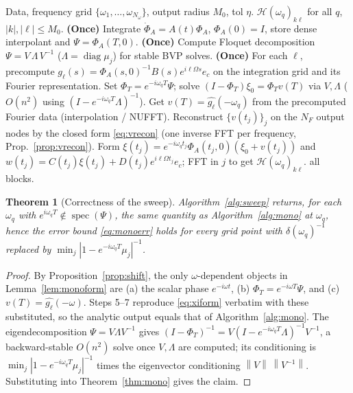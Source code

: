 \documentclass{amsart}
\newtheorem{theorem}{Theorem}
\theoremstyle{definition}
\DeclareMathOperator{\spec}{spec}
\DeclareMathOperator{\diag}{diag}
\newcommand{\norm}[1]{\left\lVert#1\right\rVert}
\newcommand{\Hcal}{\mathcal{H}}
\begin{document}
\begin{algorithm}[H]
\caption{Fast HTF frequency sweep}\label{alg:sweep}
\begin{algorithmic}[1]
\Require Data, frequency grid $\{\omega_1,\dots,\omega_{N_\omega}\}$, output radius
$M_0$, tol $\eta$.
\Ensure $\Hcal(\omega_q)_{k\ell}$ for all $q$, $|k|,|\ell|\le M_0$.
\State \textbf{(Once)} Integrate $\dot\Phi_A=A(t)\Phi_A$, $\Phi_A(0)=I$, store
dense interpolant and $\Psi=\Phi_A(T,0)$.
\State \textbf{(Once)} Compute Floquet decomposition $\Psi=V\,\Lambda\,V^{-1}$
($\Lambda=\diag\mu_j$) for stable BVP solves.
\State \textbf{(Once)} For each $\ell$, precompute $g_\ell(s)=\Phi_A(s,0)^{-1}B(s)e^{i\ell\Omega s}e_c$
on the integration grid and its Fourier representation.
  \State Set $\Phi_T=e^{-i\omega_q T}\Psi$; solve $(I-\Phi_T)\xi_0=\Phi_T v(T)$
  via $V,\Lambda$ ($O(n^2)$ using $(I-e^{-i\omega_q T}\Lambda)^{-1}$).
  \State Get $v(T)=\widehat{g_\ell}(-\omega_q)$ from the precomputed Fourier data
  (interpolation / NUFFT).
  \State Reconstruct $\{v(t_j)\}_{j}$ on the $N_F$ output nodes by the closed
  form \eqref{eq:vrecon} (one inverse FFT per frequency, Prop.~\ref{prop:vrecon}).
  \State Form $\xi(t_j)=e^{-i\omega_q t_j}\Phi_A(t_j,0)(\xi_0+v(t_j))$ and
  $w(t_j)=C(t_j)\xi(t_j)+D(t_j)e^{i\ell\Omega t_j}e_c$; FFT in $j$ to get
  $\Hcal(\omega_q)_{k\ell}$.
\EndFor
\State \Return all blocks.
\end{algorithmic}
\end{algorithm}

\begin{theorem}[Correctness of the sweep]\label{thm:sweep}
Algorithm~\ref{alg:sweep} returns, for each $\omega_q$ with
$e^{i\omega_q T}\notin\spec(\Psi)$, the same quantity as
Algorithm~\ref{alg:mono} at $\omega_q$, hence the error bound \eqref{eq:monoerr}
holds for every grid point with $\delta(\omega_q)^{-1}$ replaced by
$\min_j |1-e^{-i\omega_q T}\mu_j|^{-1}$.
\end{theorem}

\begin{proof}
By Proposition~\ref{prop:shift}, the only $\omega$-dependent objects in
Lemma~\ref{lem:monoform} are (a) the scalar phase $e^{-i\omega t}$,
(b) $\Phi_T=e^{-i\omega T}\Psi$, and (c) $v(T)=\widehat{g_\ell}(-\omega)$. Steps
5--7 reproduce \eqref{eq:xiform} verbatim with these substituted, so the
analytic output equals that of Algorithm~\ref{alg:mono}. The eigendecomposition
$\Psi=V\Lambda V^{-1}$ gives
$(I-\Phi_T)^{-1}=V(I-e^{-i\omega_q T}\Lambda)^{-1}V^{-1}$, a backward-stable
$O(n^2)$ solve once $V,\Lambda$ are computed; its conditioning is
$\min_j|1-e^{-i\omega_q T}\mu_j|^{-1}$ times the eigenvector conditioning
$\norm V\,\norm{V^{-1}}$. Substituting into Theorem~\ref{thm:mono} gives the
claim.
\end{proof}
\end{document}
